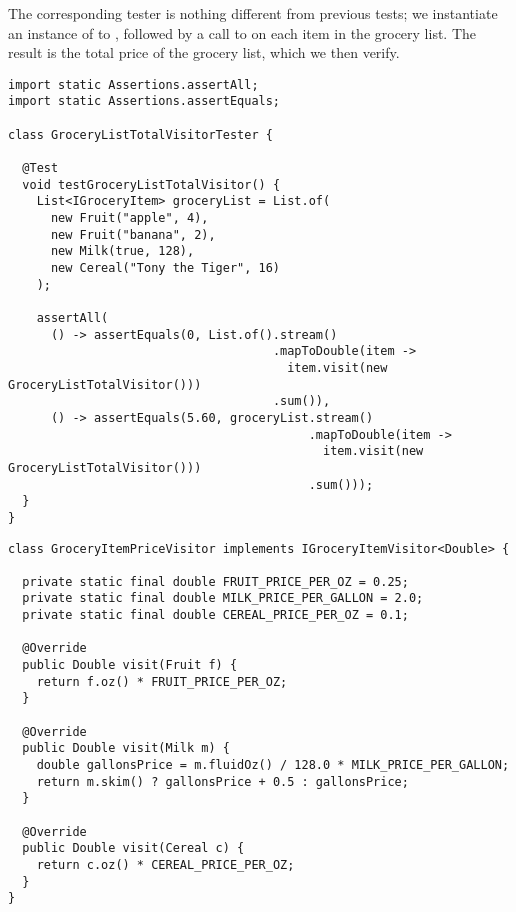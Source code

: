 The corresponding tester is nothing different from previous tests; we instantiate an instance of  to , followed by a call to  on each item in the grocery list. The result is the total price of the grocery list, which we then verify.

\begin{cl}[]{}
\begin{lstlisting}[language=MyJava]
import static Assertions.assertAll;
import static Assertions.assertEquals;

class GroceryListTotalVisitorTester {

  @Test
  void testGroceryListTotalVisitor() {
    List<IGroceryItem> groceryList = List.of(
      new Fruit("apple", 4),
      new Fruit("banana", 2),
      new Milk(true, 128),
      new Cereal("Tony the Tiger", 16)
    );

    assertAll(
      () -> assertEquals(0, List.of().stream()
                                     .mapToDouble(item -> 
                                       item.visit(new GroceryListTotalVisitor()))
                                     .sum()),
      () -> assertEquals(5.60, groceryList.stream()
                                          .mapToDouble(item -> 
                                            item.visit(new GroceryListTotalVisitor()))
                                          .sum()));
  }
}
\end{lstlisting}
\end{cl}

\begin{cl}[]{}
\begin{lstlisting}[language=MyJava]
class GroceryItemPriceVisitor implements IGroceryItemVisitor<Double> {

  private static final double FRUIT_PRICE_PER_OZ = 0.25;
  private static final double MILK_PRICE_PER_GALLON = 2.0;
  private static final double CEREAL_PRICE_PER_OZ = 0.1;

  @Override
  public Double visit(Fruit f) {
    return f.oz() * FRUIT_PRICE_PER_OZ;
  }

  @Override
  public Double visit(Milk m) {
    double gallonsPrice = m.fluidOz() / 128.0 * MILK_PRICE_PER_GALLON;
    return m.skim() ? gallonsPrice + 0.5 : gallonsPrice;
  }

  @Override
  public Double visit(Cereal c) {
    return c.oz() * CEREAL_PRICE_PER_OZ;
  }
}
\end{lstlisting}
\end{cl}
